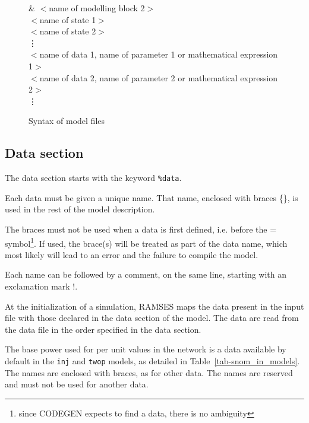 \begin{figure}[h!]
\begin{mdframed}
\& $<$name of modelling block 2$>$ \\
$<$name of state 1$>$\\
$<$name of state 2$>$\\
\hspace*{5ex}\vdots \\
$<$name of data 1, name of parameter 1 or mathematical expression 1$>$ \\
$<$name of data 2, name of parameter 2 or mathematical expression 2$>$ \\
\hspace*{5ex}\vdots
\end{mdframed}
\caption{Syntax of model files}\label{fig-syntax}
\end{figure}

\subsection{Data section}\label{sec-model-data}

The data section starts with the keyword {\tt \%data}.

Each data must be given a unique name. That name, enclosed with  braces \{\}, is used in the rest of the model description.

The braces must not be used when a data is first defined, i.e. before the = symbol\footnote{since CODEGEN expects to find a data, there is no ambiguity}. If used, the brace(s) will be treated as part of the data name, which most likely will lead to an error and the failure to compile the model.

Each name can be followed by a comment, on the same line, starting with an exclamation mark !.

At the initialization of a simulation, RAMSES maps the data present in the input file with those declared in the data section of the model. The data are read from the data file in the order specified in the data section.

The base power used for per unit values in the network is a data available by default in the {\tt inj} and {\tt twop} models, as detailed in Table~\ref{tab-snom_in_models}. The names are enclosed with braces, as for other data. The names are reserved and must not be used for another data.

